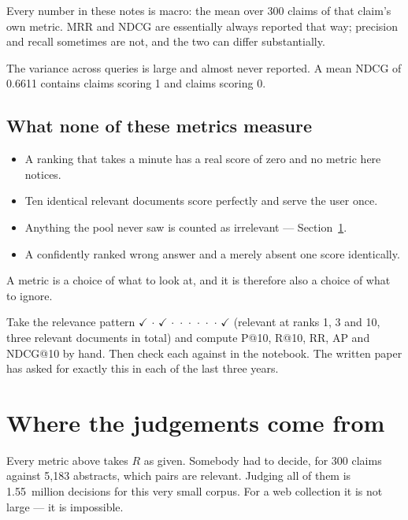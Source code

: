 \documentclass[11pt,a4paper]{article}
\begin{document}
Every number in these notes is macro: the mean over 300 claims of that claim's
own metric. MRR and NDCG are essentially always reported that way; precision
and recall sometimes are not, and the two can differ substantially.

The variance across queries is large and almost never reported. A mean NDCG of
0.6611 contains claims scoring 1 and claims scoring 0.

\subsection{What none of these metrics measure}

\begin{itemize}[leftmargin=*,nosep]
  \item {} A ranking that takes a minute has a real score of zero
        and no metric here notices.
  \item {} Ten identical relevant documents score perfectly and
        serve the user once.
  \item {} Anything the pool never saw is counted as
        irrelevant --- Section~\ref{sec:pooling}.
  \item {} A confidently ranked wrong answer and a merely absent one
        score identically.
\end{itemize}

A metric is a choice of what to look at, and it is therefore also a choice of
what to ignore.

\begin{trybox}[title={Exercise 19.2}]
Take the relevance pattern $\checkmark\,\cdot\,\checkmark\,\cdot\,\cdot\,\cdot\,\cdot\,\cdot\,\cdot\,\checkmark$
(relevant at ranks 1, 3 and 10, three relevant documents in total) and compute
P@10, R@10, RR, AP and NDCG@10 by hand. Then check each against
 in the notebook. The written paper has asked for exactly
this in each of the last three years.
\end{trybox}

\section{Where the judgements come from}\label{sec:pooling}

Every metric above takes $R$ as given. Somebody had to decide, for 300 claims
against 5{,}183 abstracts, which pairs are relevant. Judging all of them is
1.55~million decisions for this very small corpus. For a web collection it is
not large --- it is impossible.
\end{document}
